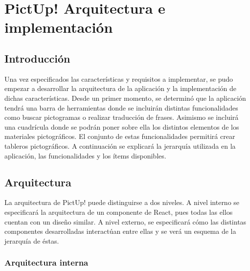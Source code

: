 \chapter{PictUp! Arquitectura e implementación}
\label{cap:arquitectura}




\section{Introducción}

Una vez especificados las características y requisitos a implementar, se pudo empezar a desarrollar la arquitectura de la aplicación y la implementación de dichas características. Desde un primer momento, se determinó que la aplicación tendrá una barra de herramientas donde se incluirán distintas funcionalidades como buscar pictogramas o realizar traducción de frases. Asimismo se incluirá una cuadrícula donde se podrán poner sobre ella los distintos elementos de los materiales pictográficos. El conjunto de estas funcionalidades permitirá crear tableros pictográficos. A continuación se explicará la jerarquía utilizada en la aplicación, las funcionalidades y los ítems disponibles. 

\section{Arquitectura}
\label{cap5:arquitectura}

La arquitectura de PictUp! puede distinguirse a dos niveles. A nivel interno se especificará la arquitectura de un componente de React, pues todas las ellos cuentan con un diseño similar. A nivel externo, se especificará cómo las distintas componentes desarrolladas interactúan entre ellas y se verá un esquema de la jerarquía de éstas. 


\subsection{Arquitectura interna}

